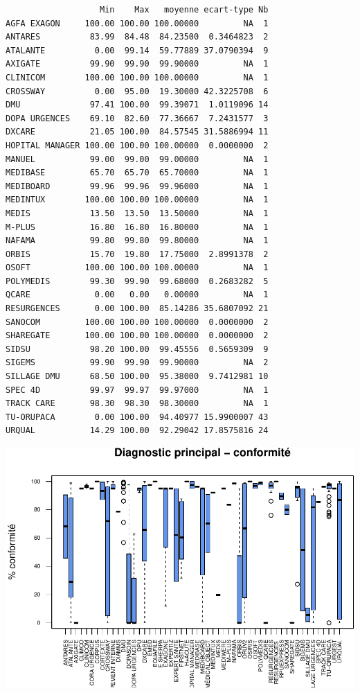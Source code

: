 \documentclass[]{article}
\begin{document}
\begin{verbatim}
                   Min    Max   moyenne ecart-type Nb
AGFA EXAGON     100.00 100.00 100.00000         NA  1
ANTARES          83.99  84.48  84.23500  0.3464823  2
ATALANTE          0.00  99.14  59.77889 37.0790394  9
AXIGATE          99.90  99.90  99.90000         NA  1
CLINICOM        100.00 100.00 100.00000         NA  1
CROSSWAY          0.00  95.00  19.30000 42.3225708  6
DMU              97.41 100.00  99.39071  1.0119096 14
DOPA URGENCES    69.10  82.60  77.36667  7.2431577  3
DXCARE           21.05 100.00  84.57545 31.5886994 11
HOPITAL MANAGER 100.00 100.00 100.00000  0.0000000  2
MANUEL           99.00  99.00  99.00000         NA  1
MEDIBASE         65.70  65.70  65.70000         NA  1
MEDIBOARD        99.96  99.96  99.96000         NA  1
MEDINTUX        100.00 100.00 100.00000         NA  1
MEDIS            13.50  13.50  13.50000         NA  1
M-PLUS           16.80  16.80  16.80000         NA  1
NAFAMA           99.80  99.80  99.80000         NA  1
ORBIS            15.70  19.80  17.75000  2.8991378  2
OSOFT           100.00 100.00 100.00000         NA  1
POLYMEDIS        99.30  99.90  99.68000  0.2683282  5
QCARE             0.00   0.00   0.00000         NA  1
RESURGENCES       0.00 100.00  85.14286 35.6807092 21
SANOCOM         100.00 100.00 100.00000  0.0000000  2
SHAREGATE       100.00 100.00 100.00000  0.0000000  2
SIDSU            98.20 100.00  99.45556  0.5659309  9
SIGEMS           99.90  99.90  99.90000         NA  2
SILLAGE DMU      68.50 100.00  95.38000  9.7412981 10
SPEC 4D          99.97  99.97  99.97000         NA  1
TRACK CARE       98.30  98.30  98.30000         NA  1
TU-ORUPACA        0.00 100.00  94.40977 15.9900007 43
URQUAL           14.29 100.00  92.29042 17.8575816 24
\end{verbatim}

\includegraphics{septembre2015_files/figure-latex/unnamed-chunk-21-1.pdf}
\end{document}
